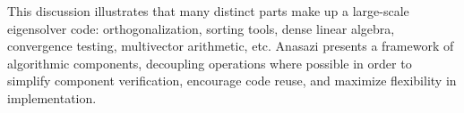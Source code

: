 \documentclass[acmtoms]{acmtrans2m}
\newcounter{algorithm}
\begin{document}

% 

This discussion illustrates that many distinct parts make up a
large-scale eigensolver code: orthogonalization, sorting tools, dense
linear algebra, convergence testing, multivector arithmetic, etc.
Anasazi presents a framework of algorithmic components, decoupling
operations where possible in order to simplify component verification,
encourage code reuse, and maximize flexibility in implementation.

\end{document}
